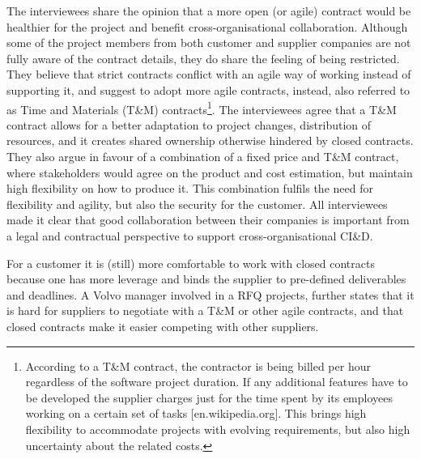 
 The interviewees share the opinion that a more open (or agile) contract would be healthier for the project and benefit cross-organisational collaboration. Although some of the project members from both customer and supplier companies are not fully aware of the contract details, they do share the feeling of being restricted. They believe that strict contracts conflict with an agile way of working instead of supporting it, and suggest to adopt more agile contracts, instead, also referred to as Time and Materials (T\&M) contracts\footnote{According to a T\&M contract, the contractor is being billed per hour regardless of the software project duration. If any additional features have to be developed the supplier charges just for the time spent by its employees working on a certain set of tasks [en.wikipedia.org]. This brings high flexibility to accommodate projects with evolving requirements, but also high uncertainty about the related costs.}. 
The interviewees agree that a T\&M contract allows for a better adaptation to project changes, distribution of resources, and it creates shared ownership otherwise hindered by closed contracts. They also argue in favour of a combination of a fixed price and T\&M contract, where stakeholders would agree on the product and cost estimation, but maintain high flexibility on how to produce it. This combination fulfils the need for flexibility and agility, but also the security for the customer. All interviewees made it clear that good collaboration between their companies is important from a legal and contractual perspective to support cross-organisational CI\&D.

 For a customer it is (still) more comfortable to work with closed contracts because one has more leverage and binds the supplier to pre-defined deliverables and deadlines. A Volvo manager involved in a RFQ projects, further states that it is hard for suppliers to negotiate with a T\&M or other agile contracts, and that closed contracts make it easier competing with other suppliers.


